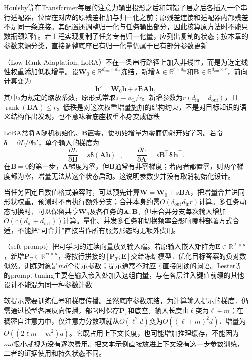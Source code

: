Houlsby等在Transformer每层的注意力输出投影之后和前馈子层之后各插入一个串行适配器，位置在对应的原残差相加与归一化之前；原残差连接和适配器内部残差不是同一条连接。其配置还调整归一化与任务输出部分，因此核算原方法时不能只数瓶颈矩阵。若工程实现复制了任务专有归一化量，应列出复制的状态；按本章的参数来源分类，直接调整底座已有归一化量仍属于已有部分参数更新

（Low-Rank Adaptation, LoRA）不在一条串行路径上加入非线性，而是为选定线性权重添加低秩增量。设$\bm W_0\in\mathbb R^{d_{\mathrm{out}}\times d_{\mathrm{in}}}$冻结，新增$\bm A\in\mathbb R^{r\times d_{\mathrm{in}}}$和$\bm B\in\mathbb R^{d_{\mathrm{out}}\times r}$，前向计算变为
\begin{equation}
  \bm h'=\bm W_0\bm h+s\bm B\bm A\bm h,
  \label{eq:ket-transfer-lora}
\end{equation}
其中$s$为规定的缩放系数，原形式常取$s=\alpha_{\mathrm L}/r$。新增参数为$r(d_{\mathrm{in}}+d_{\mathrm{out}})$，且$\operatorname{rank}(\bm B\bm A)\leq r$。低秩是对这次权重增量施加的结构约束，不是对目标知识的语义结构作出发现，也不意味着底座权重本身变成低秩

LoRA常将$\bm A$随机初始化、$\bm B$置零，使初始增量为零而仍能开始学习。若令$\bm\delta=\partial L/\partial\bm h'$，单个输入的梯度为
\[
  \frac{\partial L}{\partial\bm B}
       =s\bm\delta(\bm A\bm h)^\top,\qquad
  \frac{\partial L}{\partial\bm A}
       =s\bm B^\top\bm\delta\,\bm h^\top.
\]
在$\bm B=0$的第一步，$\bm A$梯度为零，但$\bm B$通常有非零梯度；若两者都置零，则两个梯度都为零，增量无法从这个状态启动。这说明参数少并没有取消初始化设计。

当任务固定且数值格式兼容时，可以预先计算$\bm W=\bm W_0+s\bm B\bm A$，把增量合并进同形状权重，预测时不再执行额外分支；合并本身约需$O(d_{\mathrm{out}}d_{\mathrm{in}}r)$计算。多任务动态切换时，可以保留共享$\bm W_0$及各任务的$\bm A,\bm B$，但未合并分支每次输入增加$O(r(d_{\mathrm{in}}+d_{\mathrm{out}}))$计算。量化、并发多任务和切换频率会影响哪种部署方式合适，不能把“可合并”直接当作所有服务形态均无额外费用。

（soft prompt）把可学习的连续向量放到输入端。若原输入嵌入矩阵为$\bm E\in\mathbb R^{\ell\times d}$，新增$\bm P_T\in\mathbb R^{m\times d}$，将按行拼接的$[\bm P_T;\bm E]$交给冻结模型，优化目标答案的负对数似然。训练对象是$md$个提示参数；提示通常不对应可直接阅读的词语。Lester等的prompt tuning主要在输入嵌入处加入这组向量，与在各层注入键值前缀的其他设计不能混为同一种参数计数

软提示需要训练信号和梯度传播。虽然底座参数冻结，为计算输入提示的梯度，仍需通过模型各层反向传播。部署时保存$\bm P_T$和底座，输入长度由$\ell$变为$\ell+m$；在稠密自注意力中，仅注意力分数项就从$O(\ell^2d)$变为$O((\ell+m)^2d)$，增量为$O((2\ell m+m^2)d)$。它既占用上下文长度，也可能增加推理缓存，不能因为$md$很小就视为没有逐次费用。把文本示例直接放进上下文没有这一步参数训练，二者的证据使用和持久状态不同。

